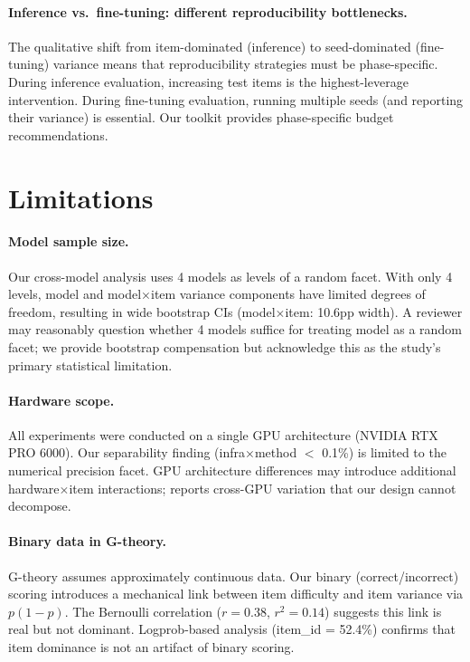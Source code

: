 \documentclass[11pt,letterpaper]{article}
\begin{document}
\paragraph{Inference vs.\ fine-tuning: different reproducibility bottlenecks.}
The qualitative shift from item-dominated (inference) to seed-dominated (fine-tuning) variance means that reproducibility strategies must be phase-specific.
During inference evaluation, increasing test items is the highest-leverage intervention.
During fine-tuning evaluation, running multiple seeds (and reporting their variance) is essential.
Our toolkit provides phase-specific budget recommendations.

\section{Limitations}

\paragraph{Model sample size.}
Our cross-model analysis uses 4 models as levels of a random facet.
With only 4 levels, model and model$\times$item variance components have limited degrees of freedom, resulting in wide bootstrap CIs (model$\times$item: 10.6pp width).
A reviewer may reasonably question whether 4 models suffice for treating model as a random facet; we provide bootstrap compensation but acknowledge this as the study's primary statistical limitation.

\paragraph{Hardware scope.}
All experiments were conducted on a single GPU architecture (NVIDIA RTX PRO 6000).
Our separability finding (infra$\times$method $<$ 0.1\%) is limited to the numerical precision facet.
GPU architecture differences may introduce additional hardware$\times$item interactions; \citet{yuan2025hardware} reports cross-GPU variation that our design cannot decompose.

\paragraph{Binary data in G-theory.}
G-theory assumes approximately continuous data.
Our binary (correct/incorrect) scoring introduces a mechanical link between item difficulty and item variance via $p(1{-}p)$.
The Bernoulli correlation ($r = 0.38$, $r^2 = 0.14$) suggests this link is real but not dominant.
Logprob-based analysis (item\_id = 52.4\%) confirms that item dominance is not an artifact of binary scoring.
\end{document}
